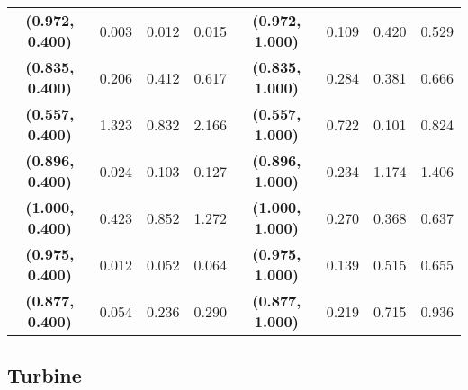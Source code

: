 \begin{table}[h]
{\begin{tabular}{@{}clllc|lll@{}}
\textbf{(0.972, 0.400)}   & 0.003                 & 0.012                   & 0.015                   & \textbf{(0.972, 1.000)}   & 0.109                 & 0.420                   & 0.529                   \\
\textbf{(0.835, 0.400)}   & 0.206                 & 0.412                   & 0.617                   & \textbf{(0.835, 1.000)}   & 0.284                 & 0.381                   & 0.666                   \\
\textbf{(0.557, 0.400)}   & 1.323                 & 0.832                   & 2.166                   & \textbf{(0.557, 1.000)}   & 0.722                 & 0.101                   & 0.824                   \\
\textbf{(0.896, 0.400)}   & 0.024                 & 0.103                   & 0.127                   & \textbf{(0.896, 1.000)}   & 0.234                 & 1.174                   & 1.406                   \\
\textbf{(1.000, 0.400)}   & 0.423                 & 0.852                   & 1.272                   & \textbf{(1.000, 1.000)}   & 0.270                 & 0.368                   & 0.637                   \\
\textbf{(0.975, 0.400)}   & 0.012                 & 0.052                   & 0.064                   & \textbf{(0.975, 1.000)}   & 0.139                 & 0.515                   & 0.655                   \\
\textbf{(0.877,   0.400)} & 0.054                 & 0.236                   & 0.290                   & \textbf{(0.877, 1.000)}   & 0.219                 & 0.715                   & 0.936                   \\ \bottomrule
\end{tabular}%
}
\end{table}

\subsection{Turbine}
